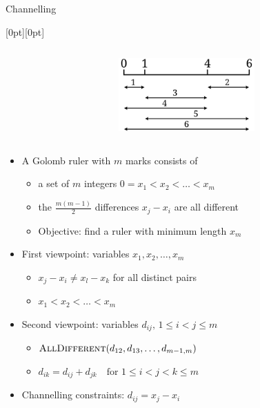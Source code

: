 \documentclass{cons-beamer}
\begin{document}
\begin{frame}{Channelling }
  \begin{example}
    \raisebox{-\height}[0pt][0pt]{%
      \begin{columns}
        \begin{column}{0.6\textwidth}
            
        \end{column}
        \begin{column}{0.4\textwidth}
          \includegraphics[height=28mm]{images/Golomb_Ruler-4.png}%
        \end{column}
      \end{columns}
    }

    \begin{itemize}
      \item A Golomb ruler with \(m\) marks consists of
        \begin{itemize}
          \item a set of \(m\) integers \(0 = x_1 < x_2 < \ldots < x_m\)
          \item the \(\frac{m(m-1)}{2}\) differences \(x_j - x_i\) are all different
          \item Objective: find a ruler with minimum length \(x_m\)
        \end{itemize}
        \vfill

      \item First viewpoint: variables \(x_1, x_2, \ldots, x_m\)
        \begin{itemize}
          \item \(x_j - x_i \neq x_l - x_k\) for all distinct pairs
          \item \(x_1 < x_2 < \ldots < x_m\)
        \end{itemize}
        \vfill

      \item Second viewpoint: variables \(d_{ij}, \, 1 \leq i < j \leq m\)
        \begin{itemize}
          \item $\textsc{AllDifferent}(d_{12}, d_{13}, \ldots, d_{m-1,m})$
          \item \(d_{ik} = d_{ij} + d_{jk} \quad \text{for } 1 \leq i < j < k \leq m\)
        \end{itemize}
        \vfill

      \item Channelling constraints: \(d_{ij} = x_j - x_i\)
    \end{itemize}
    \vfill
  \end{example}
\end{frame}
\end{document}
